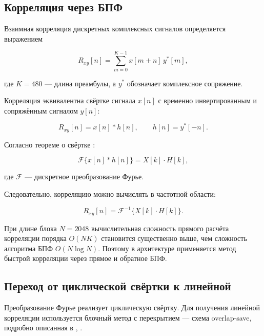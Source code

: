 
\subsection{Корреляция через БПФ}

Взаимная корреляция дискретных комплексных сигналов определяется выражением

\begin{equation}
	R_{xy}[n] = \sum_{m=0}^{K-1} x[m+n]\, y^*[m],
\end{equation}

где $K = 480$ --- длина преамбулы, а $y^*$ обозначает комплексное сопряжение.

Корреляция эквивалентна свёртке сигнала $x[n]$ с временно инвертированным и сопряжённым сигналом $y[n]$:

\begin{equation}
	R_{xy}[n] = x[n] * h[n], \qquad h[n] = y^*[-n].
\end{equation}

Согласно теореме о свёртке \cite{oppenheim_dsp}:

\begin{equation}
	\mathcal{F}\{x[n] * h[n]\} = X[k] \cdot H[k],
\end{equation}

где $\mathcal{F}$ --- дискретное преобразование Фурье.  

Следовательно, корреляцию можно вычислять в частотной области:

\begin{equation}
	R_{xy}[n] = \mathcal{F}^{-1}\{X[k] \cdot H[k]\}.
\end{equation}

При длине блока $N = 2048$ вычислительная сложность прямого расчёта корреляции порядка $O(NK)$ становится существенно выше, чем сложность алгоритма БПФ $O(N \log N)$. Поэтому в архитектуре применяется метод быстрой корреляции через прямое и обратное БПФ.

\subsection{Переход от циклической свёртки к линейной}

Преобразование Фурье реализует циклическую свёртку. Для получения линейной корреляции используется блочный метод с перекрытием --- схема overlap-save, подробно описанная в \cite{oppenheim_dsp}, \cite{smith_dspguide}.

